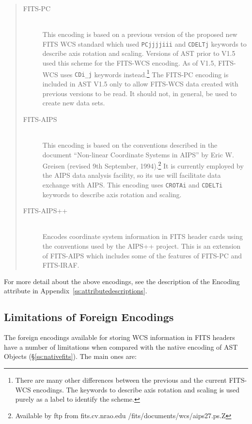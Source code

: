 \documentclass[twoside,11pt]{article}
\newcommand{\appref}[1]{Appendix~\ref{#1}}
\newcommand{\secref}[1]{\S\ref{#1}}
\newcommand{\appref}[1]{\ref{#1}}
\newcommand{\secref}[1]{\ref{#1}}
\begin{document}
\begin{quote}
\begin{description}
\item[FITS-PC]\mbox{}\\
This encoding is based on a previous version of the proposed new FITS WCS
standard which used {\tt PCjjjjiii} and {\tt CDELTj} keywords to describe
axis rotation and scaling. Versions of AST prior to V1.5 used this scheme
for the FITS-WCS encoding. As of V1.5, FITS-WCS uses {\tt CDi\_j}
keywords instead.\footnote{There are many other differences between the
previous and the current FITS-WCS encodings. The keywords to describe
axis rotation and scaling is used purely as a label to identify the
scheme.} The FITS-PC encoding is included in AST V1.5 only to allow
FITS-WCS data created with previous versions to be read. It should not,
in general, be used to create new data sets.

\item[FITS-AIPS]\mbox{}\\
This encoding is based on the conventions described in the document
``Non-linear Coordinate Systems in AIPS'' by Eric W. Greisen (revised 9th
September, 1994).\footnote{Available by ftp from fits.cv.nrao.edu
/fits/documents/wcs/aips27.ps.Z} It is currently employed by the AIPS
data analysis facility, so its use will facilitate data exchange with
AIPS. This encoding uses {\tt CROTAi} and {\tt CDELTi} keywords to
describe axis rotation and scaling.

\item[FITS-AIPS++]\mbox{}\\
Encodes coordinate system information in FITS
header cards using the conventions used by the AIPS++ project.
This is an extension of FITS-AIPS which includes some of the
features of FITS-PC and FITS-IRAF.
\end{description}
\end{quote}

For more detail about the above encodings, see the description of the
Encoding attribute in \appref{ss:attributedescriptions}. 

\subsection{\label{ss:foreignfitslimitations}Limitations of Foreign Encodings}

The foreign encodings available for storing WCS information in FITS
headers have a number of limitations when compared with the native
encoding of AST Objects (\secref{ss:nativefits}). The main ones are:
\end{document}
